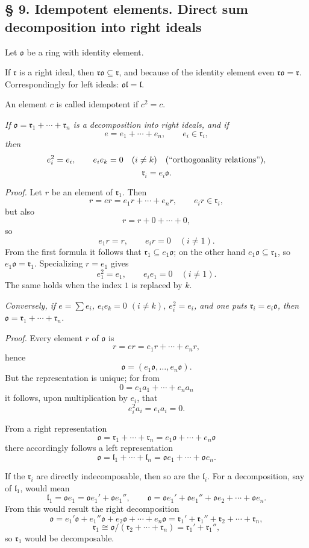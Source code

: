 \documentclass[11pt]{article}
\providecommand{\mo}{\mathfrak{o}}
\providecommand{\ml}{\mathfrak{l}}
\providecommand{\mr}{\mathfrak{r}}
\begin{document}
\subsection*{§ 9. Idempotent elements. Direct sum decomposition into right ideals}

Let $\mo$ be a ring with identity element.

If $\mr$ is a right ideal, then $\mr\mo\subseteq\mr$, and because of the identity element even $\mr\mo=\mr$. Correspondingly for left ideals: $\mo\ml=\ml$.

An element $c$ is called idempotent if $c^2=c$.

\emph{If $\mo=\mr_1+\cdots+\mr_n$ is a decomposition into right ideals, and if}
\[
        e=e_1+\cdots+e_n,
        \qquad e_i\in\mr_i,
\]
\emph{then}
\[
        e_i^2=e_i,
        \qquad e_i e_k=0\quad(i\ne k)
        \quad\hbox{(``orthogonality relations'')},
\]
\[
        \mr_i=e_i\mo.
\]

\emph{Proof.} Let $r$ be an element of $\mr_1$. Then
\[
        r=er=e_1r+\cdots+e_nr,
        \qquad e_ir\in\mr_i,
\]
but also
\[
        r=r+0+\cdots+0,
\]
so
\[
        e_1r=r,
        \qquad e_ir=0\quad(i\ne1).
\]
From the first formula it follows that $\mr_1\subseteq e_1\mo$; on the other hand $e_1\mo\subseteq\mr_1$, so $e_1\mo=\mr_1$. Specializing $r=e_1$ gives
\[
        e_1^2=e_1,
        \qquad e_i e_1=0\quad(i\ne1).
\]
The same holds when the index $1$ is replaced by $k$.

\emph{Conversely, if $e=\sum e_i$, $e_i e_k=0$ $(i\ne k)$, $e_i^2=e_i$, and one puts $\mr_i=e_i\mo$, then $\mo=\mr_1+\cdots+\mr_n$.}

\emph{Proof.} Every element $r$ of $\mo$ is
\[
        r=er=e_1r+\cdots+e_nr,
\]
hence
\[
        \mo=(e_1\mo,\ldots,e_n\mo).
\]
But the representation is unique; for from
\[
        0=e_1a_1+\cdots+e_na_n
\]
it follows, upon multiplication by $e_i$, that
\[
        e_i^2a_i=e_i a_i=0.
\]

From a right representation
\[
        \mo=\mr_1+\cdots+\mr_n=e_1\mo+\cdots+e_n\mo
\]
there accordingly follows a left representation
\[
        \mo=\ml_1+\cdots+\ml_n=\mo e_1+\cdots+\mo e_n.
\]

If the $\mr_i$ are directly indecomposable, then so are the $\ml_i$. For a decomposition, say of $\ml_1$, would mean
\[
        \ml_1=\mo e_1=\mo e_1'+\mo e_1'',
        \qquad
        \mo=\mo e_1'+\mo e_1''+\mo e_2+\cdots+\mo e_n.
\]
From this would result the right decomposition
\[
        \mo=e_1'\mo+e_1''\mo+e_2\mo+\cdots+e_n\mo
        =\mr_1'+\mr_1''+\mr_2+\cdots+\mr_n,
\]
\[
        \mr_1\cong \mo/(\mr_2+\cdots+\mr_n)=\mr_1'+\mr_1'',
\]
so $\mr_1$ would be decomposable.
\end{document}
